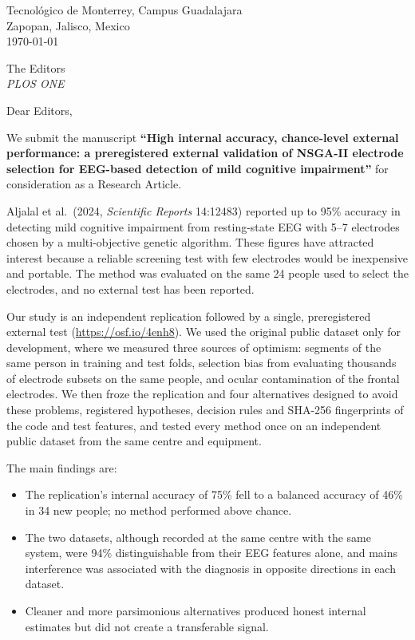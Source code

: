\documentclass[11pt,letterpaper]{article}
\begin{document}
Tecnológico de Monterrey, Campus Guadalajara\\
Zapopan, Jalisco, Mexico\\
\today

The Editors\\
\textit{PLOS ONE}

Dear Editors,

We submit the manuscript \textbf{``High internal accuracy, chance-level external performance: a preregistered external validation of NSGA-II electrode selection for EEG-based detection of mild cognitive impairment''} for consideration as a Research Article.

Aljalal et al.\ (2024, \textit{Scientific Reports} 14:12483) reported up to 95\% accuracy in detecting mild cognitive impairment from resting-state EEG with 5--7 electrodes chosen by a multi-objective genetic algorithm. These figures have attracted interest because a reliable screening test with few electrodes would be inexpensive and portable. The method was evaluated on the same 24 people used to select the electrodes, and no external test has been reported.

Our study is an independent replication followed by a single, preregistered external test (\url{https://osf.io/4enh8}). We used the original public dataset only for development, where we measured three sources of optimism: segments of the same person in training and test folds, selection bias from evaluating thousands of electrode subsets on the same people, and ocular contamination of the frontal electrodes. We then froze the replication and four alternatives designed to avoid these problems, registered hypotheses, decision rules and SHA-256 fingerprints of the code and test features, and tested every method once on an independent public dataset from the same centre and equipment.

The main findings are:
\begin{itemize}\setlength{\itemsep}{2pt}
\item The replication's internal accuracy of 75\% fell to a balanced accuracy of 46\% in 34 new people; no method performed above chance.
\item The two datasets, although recorded at the same centre with the same system, were 94\% distinguishable from their EEG features alone, and mains interference was associated with the diagnosis in opposite directions in each dataset.
\item Cleaner and more parsimonious alternatives produced honest internal estimates but did not create a transferable signal.
\end{itemize}
\end{document}
